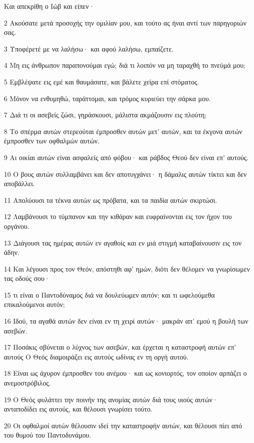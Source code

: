 \par Και απεκρίθη ο Ιώβ και είπεν·
\par 2 Ακούσατε μετά προσοχής την ομιλίαν μου, και τούτο ας ήναι αντί των παρηγοριών σας.
\par 3 Υποφέρετέ με να λαλήσω· και αφού λαλήσω, εμπαίζετε.
\par 4 Μη εις άνθρωπον παραπονούμαι εγώ; διά τι λοιπόν να μη ταραχθή το πνεύμά μου;
\par 5 Εμβλέψατε εις εμέ και θαυμάσατε, και βάλετε χείρα επί στόματος.
\par 6 Μόνον να ενθυμηθώ, ταράττομαι, και τρόμος κυριεύει την σάρκα μου.
\par 7 Διά τι οι ασεβείς ζώσι, γηράσκουσι, μάλιστα ακμάζουσιν εις πλούτη;
\par 8 Το σπέρμα αυτών στερεούται έμπροσθεν αυτών μετ' αυτών, και τα έκγονα αυτών έμπροσθεν των οφθαλμών αυτών.
\par 9 Αι οικίαι αυτών είναι ασφαλείς από φόβου· και ράβδος Θεού δεν είναι επ' αυτούς.
\par 10 Ο βους αυτών συλλαμβάνει και δεν αποτυγχάνει· η δάμαλις αυτών τίκτει και δεν αποβάλλει.
\par 11 Απολύουσι τα τέκνα αυτών ως πρόβατα, και τα παιδία αυτών σκιρτώσι.
\par 12 Λαμβάνουσι το τύμπανον και την κιθάραν και ευφραίνονται εις τον ήχον του οργάνου.
\par 13 Διάγουσι τας ημέρας αυτών εν αγαθοίς και εν μιά στιγμή καταβαίνουσιν εις τον άδην.
\par 14 Και λέγουσι προς τον Θεόν, απόστηθι αφ' ημών, διότι δεν θέλομεν να γνωρίσωμεν τας οδούς σου·
\par 15 τι είναι ο Παντοδύναμος διά να δουλεύωμεν αυτόν; και τι ωφελούμεθα επικαλούμενοι αυτόν;
\par 16 Ιδού, τα αγαθά αυτών δεν είναι εν τη χειρί αυτών· μακράν απ' εμού η βουλή των ασεβών.
\par 17 Ποσάκις σβύνεται ο λύχνος των ασεβών, και έρχεται η καταστροφή αυτών επ' αυτούς Ο Θεός διαμοιράζει εις αυτούς ωδίνας εν τη οργή αυτού.
\par 18 Είναι ως άχυρον έμπροσθεν του ανέμου· και ως κονιορτός, τον οποίον αρπάζει ο ανεμοστρόβιλος.
\par 19 Ο Θεός φυλάττει την ποινήν της ανομίας αυτών διά τους υιούς αυτών· ανταποδίδει εις αυτούς, και θέλουσι γνωρίσει τούτο.
\par 20 Οι οφθαλμοί αυτών θέλουσιν ιδεί την καταστροφήν αυτών, και θέλουσι πίει από του θυμού του Παντοδυνάμου.
